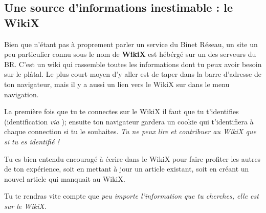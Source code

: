 
\subsection{Une source d'informations inestimable : le WikiX}
\label{WikiX}

Bien que n'étant pas à proprement parler un service du Binet Réseau, un site un peu particulier connu sous le nom de \textbf{WikiX} est hébérgé sur un des serveurs du BR.
C'est un wiki qui rassemble toutes les informations dont tu peux avoir besoin sur le plâtal.
Le plus court moyen d'y aller est de taper  dans la barre d'adresse de ton navigateur, mais il y a aussi un lien vers le WikiX sur \fkz dans le menu navigation.

La première fois que tu te connectes sur le WikiX il faut que tu t'identifies (identification \emph{via} );
ensuite ton navigateur gardera un cookie qui t'identifiera à chaque connection si tu le souhaites. \emph{Tu ne peux lire et contribuer au WikiX que si tu es identifié !}

Tu es bien entendu encouragé à écrire dans le WikiX pour faire profiter les autres de ton expérience,
soit en mettant à jour un article existant, soit en créant un nouvel article qui manquait au WikiX.

Tu te rendras vite compte que \emph{peu importe l'information que tu cherches, elle est sur le WikiX.}
